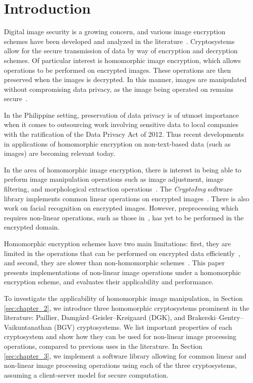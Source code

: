 \section{Introduction}
Digital image security is a growing concern, and various image encryption schemes have been developed and analyzed in the literature~\cite{murugan_survey_2018, kester_cryptographic_2015, jain_image_2016, singh_image_2015, khoirom_cryptanalysis_2018}. Cryptosystems allow for the secure transmission of data by way of encryption and decryption schemes. 
Of particular interest is homomorphic image encryption, which allows operations to be performed on encrypted images. These operations are then preserved when the images is decrypted. In this manner, images are manipulated without compromising data privacy, as the image being operated on remains secure~\cite{fontaine_survey_2007, sen_homomorphic_2013}. 

In the Philippine setting, preservation of data privacy is of utmost importance when it comes to outsourcing work involving sensitive data to local companies with the ratification of the Data Privacy Act of 2012. Thus recent developments in applications of homomorphic encryption on non-text-based data (such as images) are becoming relevant today.

In the area of homomorphic image encryption, there is interest in being able to perform image manipulation operations such as image adjustment, image filtering, and morphological extraction operations~\cite{ziad_cryptoimg:_2016, gonzalez_digital_2008}. The \textit{CryptoImg} software library implements common linear operations on encrypted images~\cite{ziad_cryptoimg:_2016}. There is also work on facial recognition on encrypted images\cite{turk_eigenfaces_1991, hutchison_privacy-preserving_2009}. However, preprocessing which requires non-linear operations, such as those in~\cite{oravec_illumination_2010}, has yet to be performed in the encrypted domain.

Homomorphic encryption schemes have two main limitations: first, they are limited in the operations that can be performed on encrypted data efficiently~\cite{li_elliptic_2012}, and second, they are slower than non-homomorphic schemes~\cite{sen_homomorphic_2013}. This paper presents implementations of non-linear image operations under a homomorphic encryption scheme, and evaluates their applicability and performance.

To investigate the applicability of homomorphic image manipulation, in Section \ref{sec:chapter_2}, we introduce three homomorphic cryptosystems prominent in the literature: Paillier, Damg{\aa}rd--Geisler--Kr{\o}igaard (DGK), and Brakerski--Gentry--Vaikuntanathan (BGV) cryptosystems. We list important properties of each cryptosystem and show how they can be used for non-linear image processing operations, compared to previous uses in the literature. In Section \ref{sec:chapter_3}, we implement a software library allowing for common linear and non-linear image processing operations using each of the three cryptosystems, assuming a client-server model for secure computation.

